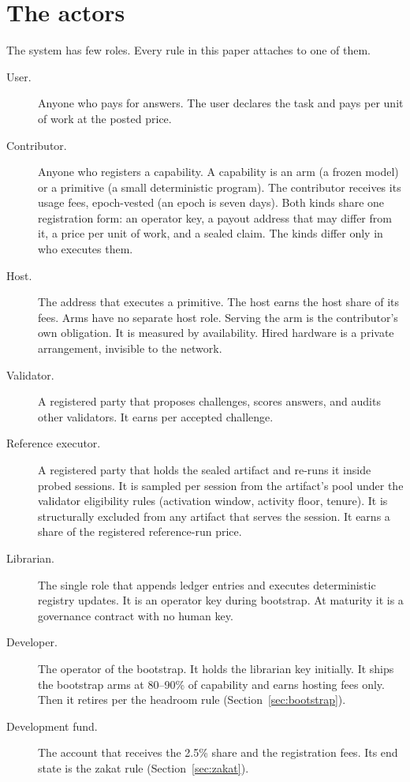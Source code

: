 \documentclass[11pt]{article}
\begin{document}
\section{The actors}

The system has few roles. Every rule in this paper attaches to one
of them.

\begin{description}
\item[User.] Anyone who pays for answers. The user declares the
task and pays per unit of work at the posted price.
\item[Contributor.] Anyone who registers a capability. A
capability is an arm (a frozen model) or a primitive (a small
deterministic program). The contributor receives its usage fees,
epoch-vested (an epoch is seven days). Both kinds share one
registration form: an operator
key, a payout address that may differ from it, a price per unit
of work, and a sealed claim. The kinds differ only in who
executes them.
\item[Host.] The address that executes a primitive. The host
earns the host share of its fees. Arms have no separate host
role. Serving the arm is the contributor's own obligation. It is
measured by availability. Hired hardware is a private
arrangement, invisible to the network.
\item[Validator.] A registered party that proposes challenges,
scores answers, and audits other validators. It earns per
accepted challenge.
\item[Reference executor.] A registered party that holds the
sealed artifact and re-runs it inside probed sessions. It is
sampled per session from the artifact's pool under the validator
eligibility rules (activation window, activity floor, tenure). It
is structurally excluded from any artifact that serves the
session. It earns a share of the registered reference-run price.
\item[Librarian.] The single role that appends ledger entries and
executes deterministic registry updates. It is an operator key
during bootstrap. At maturity it is a governance contract with no
human key.
\item[Developer.] The operator of the bootstrap. It holds the
librarian key initially. It ships the bootstrap arms at 80--90\%
of capability and earns hosting fees only. Then it retires per
the headroom rule (Section~\ref{sec:bootstrap}).
\item[Development fund.] The account that receives the 2.5\% share
and the registration fees. Its end state is the zakat rule
(Section~\ref{sec:zakat}).
\end{description}
\end{document}
